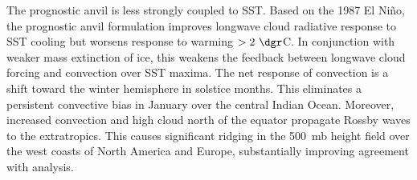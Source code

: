 \documentclass[agums]{aguplus}
\begin{document}
The prognostic anvil is less strongly coupled to SST.
Based on the 1987 El Ni\~no, the prognostic anvil formulation improves
longwave cloud radiative response to SST cooling but worsens response
to warming $> 2\ \dgr$C. 
In conjunction with weaker mass extinction of ice, this weakens the
feedback between longwave cloud forcing and convection over SST maxima.
The net response of convection is a shift toward the winter hemisphere
in solstice months.
This eliminates a persistent convective bias in January over the
central Indian Ocean.
Moreover, increased convection and high cloud north of the equator
propagate Rossby waves to the extratropics.  
This causes significant ridging in the 500~mb height field over the
west coasts of North America and Europe, substantially improving
agreement with analysis. 


\end{document}
